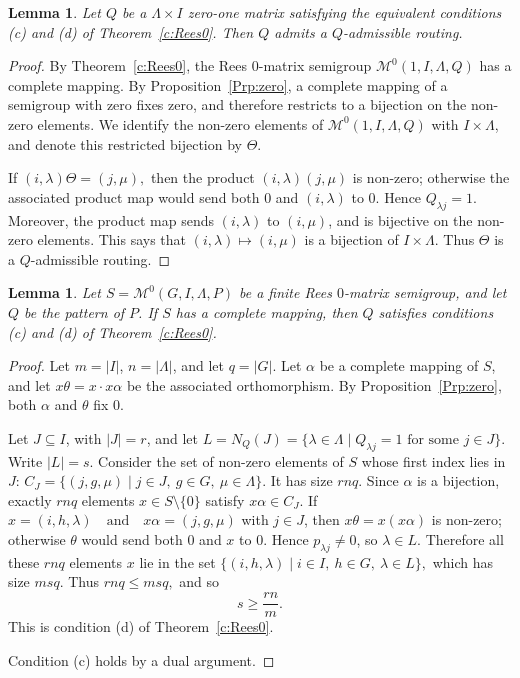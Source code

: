 \documentclass[11pt]{article}
\theoremstyle{plain}
\newtheorem{lemma}[theorem]{Lemma}
\theoremstyle{remark}
\theoremstyle{definition}
\theoremstyle{plain}
\begin{document}
\begin{lemma}\label{l:Rees0-class-routing}
Let $Q$ be a $\Lambda\times I$ zero-one matrix satisfying the equivalent
conditions (c) and (d) of Theorem~\ref{c:Rees0}. Then $Q$ admits a
$Q$-admissible routing.
\end{lemma}

\begin{proof}
By Theorem~\ref{c:Rees0}, the Rees $0$-matrix semigroup
\(\mathcal M^0(1,I,\Lambda,Q)\)
has a complete mapping. By Proposition~\ref{Prp:zero}, a complete mapping of
a semigroup with zero fixes zero, and therefore restricts to a bijection on
the non-zero elements. We identify the non-zero elements of
$\mathcal M^0(1,I,\Lambda,Q)$ with $I\times\Lambda$, and denote this
restricted bijection by $\Theta$.

If
\((i,\lambda)\Theta=(j,\mu),\)
then the product
\((i,\lambda)(j,\mu)\)
is non-zero; otherwise the associated product map would send both $0$ and
$(i,\lambda)$ to $0$. Hence $Q_{\lambda j}=1$. Moreover, the product map
sends $(i,\lambda)$ to $(i,\mu)$, and is bijective on the non-zero elements.
This says that
\((i,\lambda)\longmapsto (i,\mu)\)
is a bijection of $I\times\Lambda$. Thus $\Theta$ is a $Q$-admissible
routing.
\end{proof}

\begin{lemma}\label{l:Rees0-support-necessary}
Let
\(S=\mathcal M^0(G,I,\Lambda,P)\)
be a finite Rees $0$-matrix semigroup, and let $Q$ be the pattern of $P$.
If $S$ has a complete mapping, then $Q$ satisfies conditions \textup{(c)} and
\textup{(d)} of Theorem~\ref{c:Rees0}.
\end{lemma}

\begin{proof}
Let $m=|I|$, $n=|\Lambda|$, and let $q=|G|$. Let $\alpha$ be a complete
mapping of $S$, and let
\(x\theta=x\cdot x\alpha\)
be the associated orthomorphism. By Proposition~\ref{Prp:zero}, both
$\alpha$ and $\theta$ fix $0$.

Let $J\subseteq I$, with $|J|=r$, and let
\(L=N_Q(J)=\{\lambda\in\Lambda\mid Q_{\lambda j}=1\text{ for some }j\in J\}.\)
Write $|L|=s$. Consider the set of non-zero elements of $S$ whose first index
lies in $J$:
\(C_J=\{(j,g,\mu)\mid j\in J,\ g\in G,\ \mu\in\Lambda\}.\)
It has size $rnq$. Since $\alpha$ is a bijection, exactly $rnq$ elements
$x\in S\setminus\{0\}$ satisfy $x\alpha\in C_J$. If
\(x=(i,h,\lambda) \quad\text{and}\quad x\alpha=(j,g,\mu)\)
with $j\in J$, then $x\theta=x(x\alpha)$ is non-zero; otherwise $\theta$ would
send both $0$ and $x$ to $0$. Hence $p_{\lambda j}\ne0$, so
$\lambda\in L$. Therefore all these $rnq$ elements $x$ lie in the set
\(\{(i,h,\lambda)\mid i\in I,\ h\in G,\ \lambda\in L\},\)
which has size $msq$. Thus
\(rnq\le msq,\)
and so
\[
        s\ge \frac{rn}{m}.
\]
This is condition \textup{(d)} of Theorem~\ref{c:Rees0}.

Condition \textup{(c)} holds by a dual argument.
\end{proof}
\end{document}
